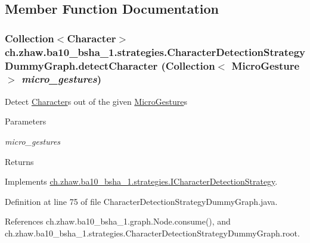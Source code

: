 \subsection{Member Function Documentation}
\hypertarget{classch_1_1zhaw_1_1ba10__bsha__1_1_1strategies_1_1CharacterDetectionStrategyDummyGraph_a6538ab532757576966ecf883ab771e32}{
\subsubsection[{detectCharacter}]{\setlength{\rightskip}{0pt plus 5cm}Collection$<${\bf Character}$>$ ch.zhaw.ba10\_\-bsha\_\-1.strategies.CharacterDetectionStrategyDummyGraph.detectCharacter (Collection$<$ {\bf MicroGesture} $>$ {\em micro\_\-gestures})}}
\label{classch_1_1zhaw_1_1ba10__bsha__1_1_1strategies_1_1CharacterDetectionStrategyDummyGraph_a6538ab532757576966ecf883ab771e32}
Detect \hyperlink{classch_1_1zhaw_1_1ba10__bsha__1_1_1Character}{Character}s out of the given \hyperlink{}{MicroGesture}s


\begin{DoxyParams}{Parameters}
\item[{\em micro\_\-gestures}]\end{DoxyParams}
\begin{DoxyReturn}{Returns}

\end{DoxyReturn}


Implements \hyperlink{interfacech_1_1zhaw_1_1ba10__bsha__1_1_1strategies_1_1ICharacterDetectionStrategy_a994429a274e75c471d18aca69dce2c1d}{ch.zhaw.ba10\_\-bsha\_\-1.strategies.ICharacterDetectionStrategy}.

Definition at line 75 of file CharacterDetectionStrategyDummyGraph.java.

References ch.zhaw.ba10\_\-bsha\_\-1.graph.Node.consume(), and ch.zhaw.ba10\_\-bsha\_\-1.strategies.CharacterDetectionStrategyDummyGraph.root.

